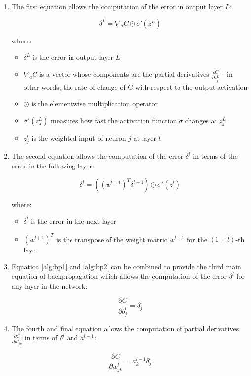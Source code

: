 \begin{enumerate}
    \item The first equation allows the computation of the error in output layer $L$:
   
    \begin{equation}\label{alg:bp1}
        \delta^L = \nabla_aC\odot\sigma'(z^L)
    \end{equation}

    where:
    \begin{itemize}
         \item $\delta^L$ is the error in output layer $L$
        \item $\nabla_aC$ is a vector whose components are the partial derivatives $\frac{\partial C}{\partial a_j^L}$ - in other words, the rate of change of C with   respect to the output activation
        \item $\odot$ is the elementwise multiplication operator
        \item $\sigma'(z_J^L)$ measures how fast the activation function $\sigma$ changes at $z_j^L$
        \item $z_j^l$ is the weighted input of neuron $j$ at layer $l$
    \end{itemize}

    \item The second equation allows the computation of the error $\delta^l$ in terms of the error in the following layer:
     
    \begin{equation}\label{alg:bp2}
        \delta^l = ((w^{l+1})^T\delta^{l+1})\odot\sigma'(z^l)
    \end{equation}

    where:
    \begin{itemize}
        \item $\delta^l$ is the error in the next layer
        \item $(w^{l+1})^T$ is the transpose of the weight matric $w^{l+1}$ for the $(1+l)$-th layer
    \end{itemize}

    \item Equation \ref{alg:bp1} and \ref{alg:bp2} can be combined to provide the third main equation of backpropagation which allows the computation of the error $\delta^l$ for any layer in the network:
    
    \begin{equation}\label{alg:bp3}
        \frac{\partial C}{\partial b_j^l} = \delta_j^l
    \end{equation}

    \item The fourth and final equation allows the computation of partial derivatives $\frac{\partial C}{\partial w_{jk}^l}$ in terms of $\delta^l$ and $a^{l-1}$:
    
    \begin{equation}\label{alg:bp4}
        \frac{\partial C}{\partial w_{jk}^l} = a_k^{l-1}\delta_j^l
    \end{equation}
\end{enumerate}

